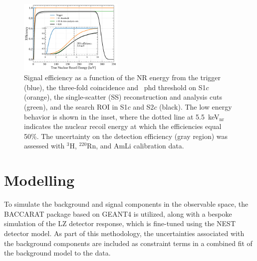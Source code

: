 \documentclass[reprint, showpacs,
preprintnumbers,
amsmath,amssymb,
aps, floatfix,
superscriptaddress,
prd, nofootinbib]{revtex4-1}
\begin{document}
\begin{figure}[t]
    \centering
    \includegraphics[trim={5 5 5 5},clip, width=0.44\textwidth]{FlatNR_efficiencies_NoSkew_ERTune}
\caption{Signal efficiency as a function of the NR energy from the trigger (blue), the three-fold coincidence and ~phd threshold on S1$c$ (orange), the single-scatter (SS) reconstruction and analysis cuts (green), and the search ROI in S1$c$ and S2$c$ (black). 
The low energy behavior is shown in the inset, where the dotted line at 5.5~keV$_{\text{nr}}$ indicates the nuclear recoil energy at which the efficiencies equal 50\%.
The uncertainty on the detection efficiency (gray region) was assessed with ${}^3$H, ${}^{220}$Rn, and AmLi calibration data. 
}
    \label{fig:acceptances}
\end{figure}


\section{\label{sec:model_and_stats}Modelling}
To simulate the background and signal components in the observable space, the BACCARAT package based on GEANT4 \cite{LZ:simulations_2021, ALLISON2016} is utilized, along with a bespoke simulation of the LZ detector response, which is fine-tuned using the NEST detector model. 
As part of this methodology, the uncertainties associated with the background components are included as constraint terms in a combined fit of the background model to the data.
\end{document}
